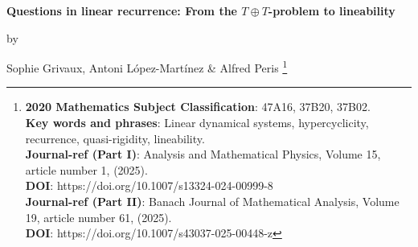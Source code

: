 \documentclass[openright,11pt]{article}
\newcommand\blfootnote[1]{%
	\begingroup
	\renewcommand\thefootnote{}\footnote{#1}%
	\addtocounter{footnote}{-1}%
	\endgroup}
\theoremstyle{plain}
\theoremstyle{definition}
\newcommand{\Fc}{\mathcal{F}}
\begin{document}
\begin{center}
	\begin{LARGE}
		{\bf Questions in linear recurrence: From the $T\oplus T$-problem to lineability}
	\end{LARGE}
\end{center}

\vspace*{-0.4cm}

\begin{center}
	\begin{large}
		by
	\end{large}
\end{center}

\vspace*{-0.4cm}

\begin{center}
	\begin{large}
		Sophie Grivaux, Antoni L\'opez-Mart\'inez \& Alfred Peris\blfootnote{\textbf{2020 Mathematics Subject Classification}: 47A16, 37B20, 37B02.\\ \textbf{Key words and phrases}: Linear dynamical systems, hypercyclicity, recurrence, quasi-rigidity, lineability.\\ \textbf{Journal-ref (Part I)}: Analysis and Mathematical Physics, Volume 15, article number 1, (2025).\\ \textbf{DOI}: https://doi.org/10.1007/s13324-024-00999-8\\ \textbf{Journal-ref (Part II)}: Banach Journal of Mathematical Analysis, Volume 19, article number 61, (2025).\\ \textbf{DOI}: https://doi.org/10.1007/s43037-025-00448-z}
	\end{large}
\end{center}

\vspace*{-0.2cm}

\begin{abstract}
	We study, for a continuous linear operator $T$ on an F-space $X$, when the direct sum operator $T\oplus T$ is recurrent on $X\oplus X$. In particular: we establish, for recurrence, the analogous notion to that of (topological) {\em weak-mixing} for transitivity/hypercyclicity, namely {\em quasi-rigidity}; and we construct a recurrent but not quasi-rigid operator on each infinite-dimensional Banach space, solving the {\em $T\oplus T$-recurrence problem} in the negative way. The quasi-rigidity notion is closely related to the {\em dense lineability} of the set of recurrent vectors, and using similar conditions we study the lineability and dense lineability properties for the set of $\Fc$-recurrent vectors. \textbf{This document has been split into two already published papers (see \cite{GrivauxLoPe2025_AMP_questions-I} and \cite{GrivauxLoPe2025_BJMA_questions-II})}.
\end{abstract}
\end{document}
